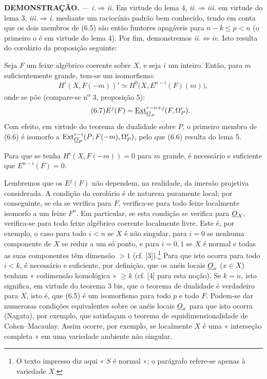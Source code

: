 \noindent\textbf{DEMONSTRAÇÃO.} --- \textit{i.}$\Rightarrow$\textit{ii.} Em
virtude do lema 4, \textit{ii.}$\Rightarrow$\textit{iii.} em virtude do lema 3,
\textit{iii.}$\Rightarrow$\textit{i.} mediante um raciocínio padrão bem conhecido,
tendo em conta que os dois membros de (6.5) são então funtores apagáveis
para $n-k\leq p<n$ (o primeiro o é em virtude do lema 4). Por fim, demonstremos
\textit{ii.}$\Leftrightarrow$\textit{iv.} Isto resulta do corolário da
proposição seguinte:

 Seja $F$ um feixe algébrico coerente sobre $X$, e
seja $i$ um inteiro. Então, para $m$ suficientemente grande, tem-se um isomorfismo:
\begin{equation}\tag{6.6}
  H^{i}(X,F(-m))'
  \simeq H^{0}\bigl(X,E^{n-i}(F)(m)\bigr),
\end{equation}
onde se põe (compare-se n\textsuperscript{o} 3, proposição 5):
\begin{equation}\tag{6.7}
  E^{j}(F)=\underline{\operatorname{Ext}}_{\underline{O}_P}^{r-n+j}(F,\Omega_P^{r}).
\end{equation}
Com efeito, em virtude do teorema de dualidade sobre $P$, o primeiro membro de (6.6)
é isomorfo a
$\operatorname{Ext}_{\underline{O}_P}^{r-i}(P;F(-m),\Omega_P^{r})$, pelo que (6.6) resulta
do lema 5.

 Para que se tenha $H^{i}(X,F(-m))=0$ para $m$ grande, é
necessário e suficiente que $E^{n-i}(F)=0$.

Lembremos que os $E^{j}(F)$ não dependem, na realidade, da imersão projetiva
considerada. A condição do corolário é de natureza puramente local; por conseguinte,
se ela se verifica para $F$, verifica-se para todo feixe localmente
isomorfo a um feixe $F^{n}$. Em particular, se esta condição se verifica
para $\underline{O}_X$, verifica-se para todo feixe algébrico coerente localmente
livre. Este é, por exemplo, o caso para todo $i<n$ se $X$ é não singular, para
$i=0$ se nenhuma componente de $X$ se reduz a um só ponto, e para $i=0,1$
se $X$ é normal e todas as suas componentes têm dimensão $>1$ (cf.
[3]).\footnote{O texto impresso diz aqui « $S$ é normal »; o parágrafo
refere-se apenas à variedade $X$.} Para que isto ocorra para todo
$i<k$, é necessário e suficiente, por definição, que os anéis locais
$\underline{O}_x$ ($x\in X$) tenham « codimensão homológica » $\geq k$ (cf. [4]
para esta noção). Se $k=n$, isto significa, em virtude do teorema 3 bis, que o
teorema de dualidade é verdadeiro para $X$, isto é, que (6.5) é um isomorfismo para
todo $p$ e todo $F$. Podem-se dar numerosas condições equivalentes sobre
os anéis locais $\underline{O}_x$ para que isto ocorra (Nagata), por exemplo, que
satisfaçam o teorema de equidimensionalidade de Cohen--Macaulay. Assim ocorre,
por exemplo, se localmente $X$ é uma « interseção completa » em uma
variedade ambiente não singular.

